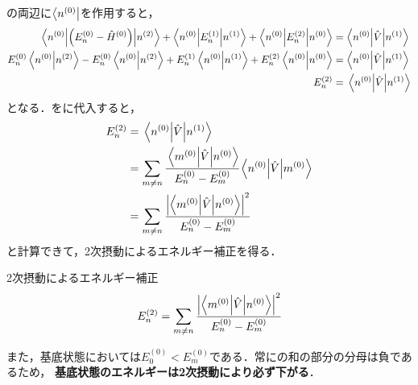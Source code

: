 \documentclass{report}
\begin{document}
  の両辺に$\bra{n^{(0)}}$を作用すると，
  \begin{align}
    \mel**{n^{(0)}}{\qty(E_n^{(0)} - \hat{H}^{(0)})}{n^{(2)}} + \mel**{n^{(0)}}{E_n^{(1)}}{n^{(1)}} + \mel**{n^{(0)}}{E_n^{(2)}}{n^{(0)}} &= \mel**{n^{(0)}}{\hat{V}}{n^{(1)}} \\ 
    E_n^{(0)}\braket{n^{(0)}}{n^{(2)}} - E_n^{(0)}\braket{n^{(0)}}{n^{(2)}} + E_n^{(1)}\braket{n^{(0)}}{n^{(1)}} + E_n^{(2)}\braket{n^{(0)}}{n^{(0)}} &= \mel**{n^{(0)}}{\hat{V}}{n^{(1)}}\\
    E_n^{(2)} &= \mel{n^{(0)}}{\hat{V}}{n^{(1)}}\label{2nd-order-tmp}
  \end{align}
  となる．をに代入すると，
  \begin{align}
    E_n^{(2)} &= \mel{n^{(0)}}{\hat{V}}{n^{(1)}} \\ 
    &= \sum_{m\neq n}\cfrac{\mel**{m^{(0)}}{\hat{V}}{n^{(0)}}}{E_n^{(0)} - E_m^{(0)}}\mel{n^{(0)}}{\hat{V}}{m^{(0)}} \\ 
    &= \sum_{m\neq n}\cfrac{\abs{\mel**{m^{(0)}}{\hat{V}}{n^{(0)}}}^2}{E_n^{(0)} - E_m^{(0)}}
  \end{align}
  と計算できて，2次摂動によるエネルギー補正を得る．
  \begin{itembox}[l]{2次摂動によるエネルギー補正}
    \begin{align}
      E_n^{(2)} = \sum_{m\neq n}\cfrac{\abs{\mel**{m^{(0)}}{\hat{V}}{n^{(0)}}}^2}{E_n^{(0)} - E_m^{(0)}}\label{2nd-order-perturbation-eigenvalue}
    \end{align}
  \end{itembox}
  また，基底状態においては$E_{0}^{(0)} < E_m^{(0)}$である．常にの和の部分の分母は負であるため，
  \textbf{基底状態のエネルギーは2次摂動により必ず下がる}．
\end{document}
